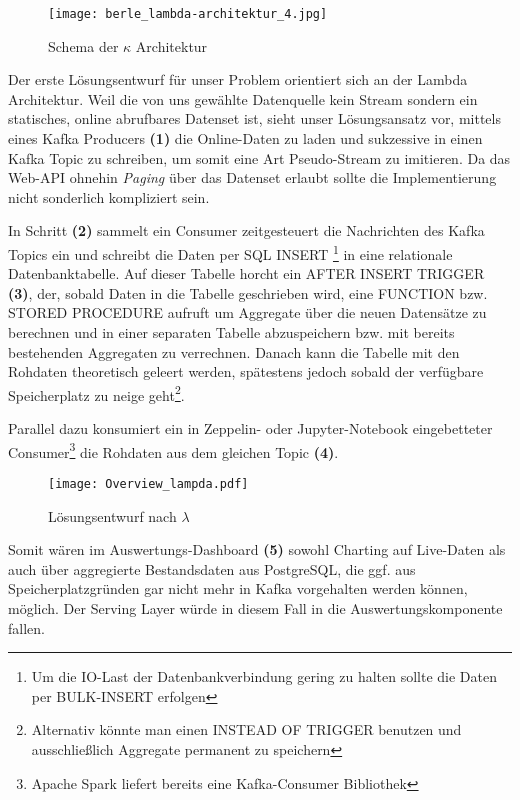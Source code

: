 \begin{description}
\begin{figure}[h]
	\centering
	\texttt{[image: berle\_lambda-architektur\_4.jpg]}
	\caption[Schema der $\kappa$ Architektur]{Schema der $\kappa$ Architektur\citep{TODO}}
	\label{fig:KappaArchitecture}
\end{figure}

\end{description}

Der erste Lösungsentwurf für unser Problem orientiert sich an der Lambda Architektur. Weil die von uns gewählte Datenquelle kein Stream sondern ein statisches, online abrufbares Datenset ist, sieht unser Lösungsansatz vor, mittels eines Kafka Producers \textbf{(1)} die Online-Daten zu laden und sukzessive in einen Kafka Topic zu schreiben, um somit eine Art Pseudo-Stream zu imitieren. Da das Web-API ohnehin \textit{Paging} über das Datenset erlaubt sollte die Implementierung nicht sonderlich kompliziert sein.

In Schritt \textbf{(2)} sammelt ein Consumer zeitgesteuert die Nachrichten des Kafka Topics ein und schreibt die Daten per SQL INSERT \footnote{Um die IO-Last der Datenbankverbindung gering zu halten sollte die Daten per BULK-INSERT erfolgen} in eine relationale Datenbanktabelle. Auf dieser Tabelle horcht ein AFTER INSERT TRIGGER \textbf{(3)}, der, sobald Daten in die Tabelle geschrieben wird, eine FUNCTION bzw. STORED PROCEDURE aufruft um Aggregate über die neuen Datensätze zu berechnen und in einer separaten Tabelle abzuspeichern bzw. mit bereits bestehenden Aggregaten zu verrechnen. Danach kann die Tabelle mit den Rohdaten theoretisch geleert werden, spätestens jedoch sobald der verfügbare Speicherplatz zu neige geht\footnote{Alternativ könnte man einen INSTEAD OF TRIGGER benutzen und ausschließlich Aggregate permanent zu speichern}.

Parallel dazu konsumiert ein in Zeppelin- oder Jupyter-Notebook eingebetteter Consumer\footnote{Apache Spark liefert bereits eine Kafka-Consumer Bibliothek} die Rohdaten aus dem gleichen Topic \textbf{(4)}. 

\begin{figure}[h] %
	\centering
	\texttt{[image: Overview\_lampda.pdf]}
	\caption[Lösungsentwurf nach $\lambda$]{Lösungsentwurf nach $\lambda$}
	\label{fig:OurLampdaArchitecture}
\end{figure}

Somit wären im Auswertungs-Dashboard \textbf{(5)} sowohl Charting auf Live-Daten als auch über aggregierte Bestandsdaten aus PostgreSQL, die ggf. aus Speicherplatzgründen gar nicht mehr in Kafka vorgehalten werden können, möglich. Der Serving Layer würde in diesem Fall in die Auswertungskomponente fallen.


